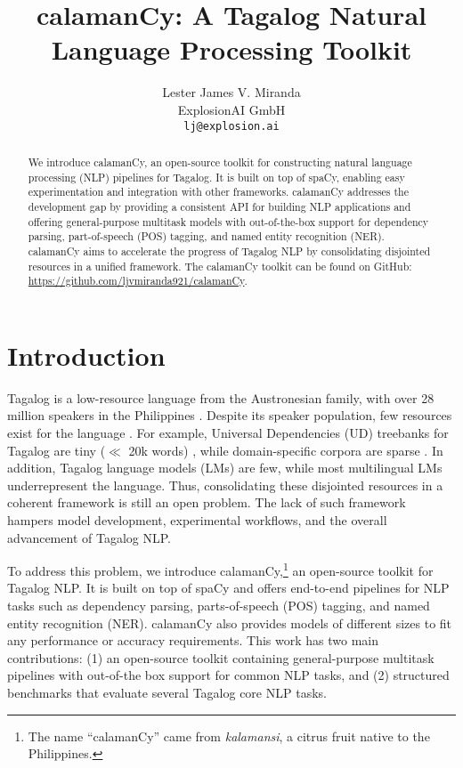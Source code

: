 \documentclass[11pt]{article}
\title{calamanCy: A Tagalog Natural Language Processing Toolkit}
\author{Lester James V. Miranda \\
  ExplosionAI GmbH \\
  \texttt{lj@explosion.ai}}
\begin{document}
\maketitle
\begin{abstract}
  We introduce calamanCy, an open-source toolkit for constructing natural language processing (NLP) pipelines for Tagalog.
  It is built on top of spaCy, enabling easy experimentation and integration with other frameworks.  
  calamanCy addresses the development gap by providing a consistent API for building NLP applications and offering general-purpose multitask models with out-of-the-box support for dependency parsing, part-of-speech (POS) tagging, and named entity recognition (NER).
  calamanCy aims to accelerate the progress of Tagalog NLP by consolidating disjointed resources in a unified framework.
  The calamanCy toolkit can be found on GitHub: \url{https://github.com/ljvmiranda921/calamanCy}.
\end{abstract}

\section{Introduction}

Tagalog is a low-resource language from the Austronesian family, with over 28 million speakers in the Philippines \citep{Lewis2009EthnologueL}.
Despite its speaker population, few resources exist for the language \citep{Cruz2021ImprovingLL}. 
For example, Universal Dependencies (UD) treebanks for Tagalog are tiny ($\ll$ 20k words) \citep{Samson2018TRG,Aquino2020ParsingIT}, 
while domain-specific corpora are sparse \citep{Cabasag2016HatespeechIP,Livelo2018IntelligentDI}. 
In addition, Tagalog language models (LMs) \citep{Cruz2021ImprovingLL,Jiang2021PretrainedLM} are few, while most multilingual LMs \citep{Conneau2019UnsupervisedCR,Devlin2019BERTPO} underrepresent the language.
Thus, consolidating these disjointed resources in a coherent framework is still an open problem.
The lack of such framework hampers model development, experimental workflows, and the overall advancement of Tagalog NLP.

To address this problem, we introduce calamanCy,\footnote[1]{
  The name ``calamanCy'' came from \textit{kalamansi}, a citrus fruit native to the Philippines.}
an open-source toolkit for Tagalog NLP. 
It is built on top of spaCy \citep{Honnibal2020Spacy} and offers end-to-end pipelines for NLP tasks such as dependency parsing, parts-of-speech (POS) tagging, and named entity recognition (NER). 
calamanCy also provides models of different sizes to fit any performance or accuracy requirements.
This work has two main contributions: (1) an open-source toolkit containing general-purpose multitask pipelines with out-of-the box support for common NLP tasks, and (2) structured benchmarks that evaluate several Tagalog core NLP tasks.
\end{document}
